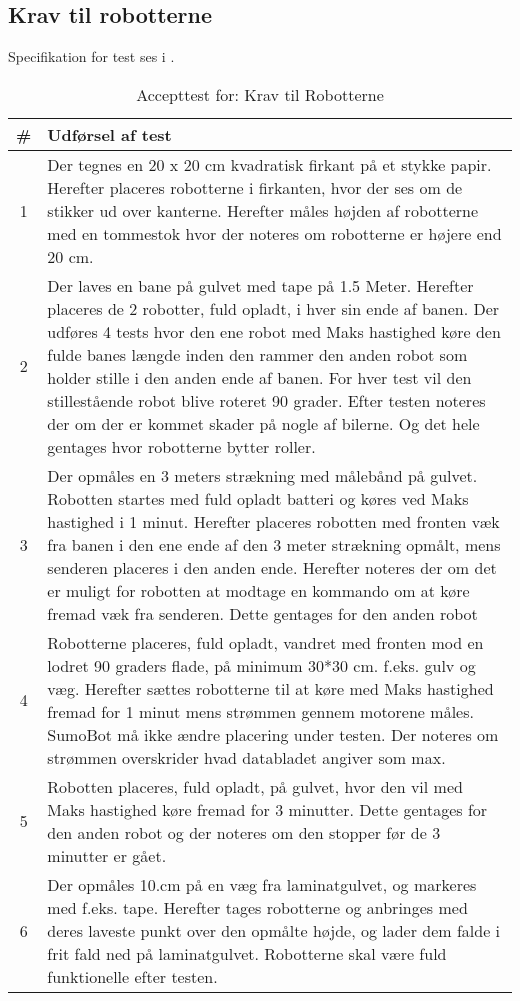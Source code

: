 \subsection{Krav til robotterne}
Specifikation for test ses i .
\begin{table}[]
\centering
\caption{Accepttest for: Krav til Robotterne}\label{tab:Robotkrav}
\begin{tabular}{c p{7cm}}
\# & \textbf{Udførsel af test} \\ \midrule
1 & Der tegnes en 20 x 20 cm kvadratisk firkant på et stykke papir. Herefter placeres robotterne i firkanten, hvor der ses om de stikker ud over kanterne. Herefter måles højden af robotterne med en tommestok hvor der noteres om robotterne er højere end 20 cm. \\\midrule
2 & Der laves en bane på gulvet med tape på 1.5 Meter. Herefter placeres de 2 robotter, fuld opladt, i hver sin ende af banen. Der udføres 4 tests hvor den ene robot med Maks hastighed køre den fulde banes længde inden den rammer den anden robot som holder stille i den anden ende af banen. For hver test vil den stillestående robot blive roteret 90 grader. Efter testen noteres der om der er kommet skader på nogle af bilerne. Og det hele gentages hvor robotterne bytter roller. \\\midrule
3 & Der opmåles en 3 meters strækning med målebånd på gulvet. Robotten startes med fuld opladt batteri og køres ved Maks hastighed i 1 minut. Herefter placeres robotten med fronten væk fra banen i den ene ende af den 3 meter strækning opmålt, mens senderen placeres i den anden ende. Herefter noteres der om det er muligt for robotten at modtage en kommando om at køre fremad væk fra senderen. Dette gentages for den anden robot \\\midrule
4 & Robotterne placeres, fuld opladt, vandret med fronten mod en lodret 90 graders flade, på minimum 30*30 cm. f.eks. gulv og væg. Herefter sættes robotterne til at køre med Maks hastighed fremad for 1 minut mens strømmen gennem motorene måles. SumoBot må ikke ændre placering under testen. Der noteres om strømmen overskrider hvad databladet angiver som max.
\\\midrule
5 & Robotten placeres, fuld opladt, på gulvet, hvor den vil med Maks hastighed køre fremad for 3 minutter. Dette gentages for den anden robot og der noteres om den stopper før de 3 minutter er gået. \\\midrule
6 & Der opmåles 10.cm på en væg fra laminatgulvet, og markeres med f.eks. tape. Herefter tages robotterne og anbringes med deres laveste punkt over den opmålte højde, og lader dem falde i frit fald ned på laminatgulvet. Robotterne skal være fuld funktionelle efter testen.  \\\midrule

\end{tabular}
\end{table}
